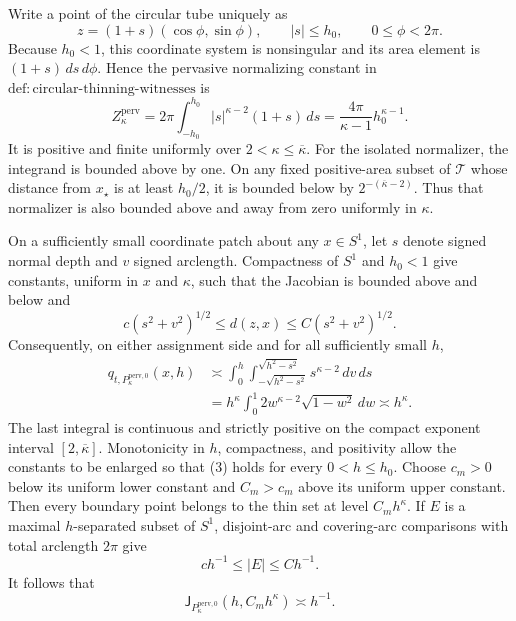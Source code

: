 Write a point of the circular tube uniquely as
\[
 z=(1+s)(\cos\phi,\sin\phi),\qquad |s|\le h_0,
 \qquad 0\le\phi<2\pi.
\]
Because \(h_0<1\), this coordinate system is nonsingular and its area element is \((1+s)\,ds\,d\phi\).  Hence the pervasive normalizing constant in \(\mathrm{def:circular\text{-}thinning\text{-}witnesses}\) is
\[
 Z_{\kappa}^{\mathrm{perv}}
 =2\pi\int_{-h_0}^{h_0}|s|^{\kappa-2}(1+s)\,ds
 =\frac{4\pi}{\kappa-1}h_0^{\kappa-1}. \tag{1}
\]
It is positive and finite uniformly over \(2<\kappa\le\overline\kappa\).  For the isolated normalizer, the integrand is bounded above by one.  On any fixed positive-area subset of \(\mathcal T\) whose distance from \(x_{\star}\) is at least \(h_0/2\), it is bounded below by \(2^{-(\overline\kappa-2)}\).  Thus that normalizer is also bounded above and away from zero uniformly in \(\kappa\).

On a sufficiently small coordinate patch about any \(x\in S^1\), let \(s\) denote signed normal depth and \(v\) signed arclength.  Compactness of \(S^1\) and \(h_0<1\) give constants, uniform in \(x\) and \(\kappa\), such that the Jacobian is bounded above and below and
\[
 c(s^2+v^2)^{1/2}\le d(z,x)\le C(s^2+v^2)^{1/2}. \tag{2}
\]
Consequently, on either assignment side and for all sufficiently small \(h\),
\[
 \begin{aligned}
 q_{t,P_{\kappa}^{\mathrm{perv},0}}(x,h)
 &\asymp \int_0^h\int_{-\sqrt{h^2-s^2}}^{\sqrt{h^2-s^2}}
 s^{\kappa-2}\,dv\,ds\\
 &=h^{\kappa}\int_0^1 2w^{\kappa-2}\sqrt{1-w^2}\,dw
 \asymp h^{\kappa}.
 \end{aligned} \tag{3}
\]
The last integral is continuous and strictly positive on the compact exponent interval \([2,\overline\kappa]\).  Monotonicity in \(h\), compactness, and positivity allow the constants to be enlarged so that (3) holds for every \(0<h\le h_0\).  Choose \(c_m>0\) below its uniform lower constant and \(C_m>c_m\) above its uniform upper constant.  Then every boundary point belongs to the thin set at level \(C_mh^{\kappa}\).  If \(E\) is a maximal \(h\)-separated subset of \(S^1\), disjoint-arc and covering-arc comparisons with total arclength \(2\pi\) give
\[
 c h^{-1}\le |E|\le C h^{-1}.
\]
It follows that
\[
 \mathsf J_{P_{\kappa}^{\mathrm{perv},0}}(h,C_mh^{\kappa})
 \asymp h^{-1}. \tag{4}
\]

